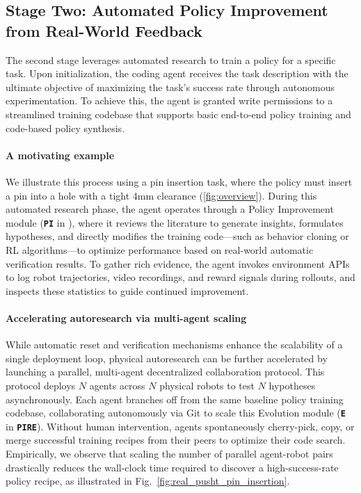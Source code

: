 \subsection{Stage Two: Automated Policy Improvement from Real-World Feedback}\label{sec:method-tree}
The second stage leverages automated research to train a policy for a specific task. Upon initialization, the coding agent receives the task description with the ultimate objective of maximizing the task's success rate through autonomous experimentation. To achieve this, the agent is granted write permissions to a streamlined training codebase that supports basic end-to-end policy training and code-based policy synthesis. 
\vspace{-2mm}
\paragraph{A motivating example}
We illustrate this process using a pin insertion task, where the policy must insert a pin into a hole with a tight 4mm clearance (\cref{fig:overview}). During this automated research phase, the agent operates through a Policy Improvement module (\textbf{\texttt{{PI}}} in \method), where it reviews the literature to generate insights, formulates hypotheses, and directly modifies the training code---such as behavior cloning or RL algorithms---to optimize performance based on real-world automatic verification results. To gather rich evidence, the agent invokes environment APIs to log robot trajectories, video recordings, and reward signals during rollouts, and inspects these statistics to guide continued improvement. 

\vspace{-2mm}
\paragraph{Accelerating autoresearch via multi-agent scaling}\label{sec:method-fleet}
While automatic reset and verification mechanisms enhance the scalability of a single deployment loop, physical autoresearch can be further accelerated by launching a parallel, multi-agent decentralized collaboration protocol. This protocol deploys $N$ agents across $N$ physical robots to test $N$ hypotheses asynchronously. Each agent branches off from the same baseline policy training codebase, collaborating autonomously via Git to scale this Evolution module (\textbf{\texttt{{E}}} in \textbf{\texttt{{PIRE}}}). Without human intervention, agents spontaneously cherry-pick, copy, or merge successful training recipes from their peers to optimize their code search. Empirically, we observe that scaling the number of parallel agent-robot pairs drastically reduces the wall-clock time required to discover a high-success-rate policy recipe, as illustrated in Fig.~\ref{fig:real_pusht_pin_insertion}. 

